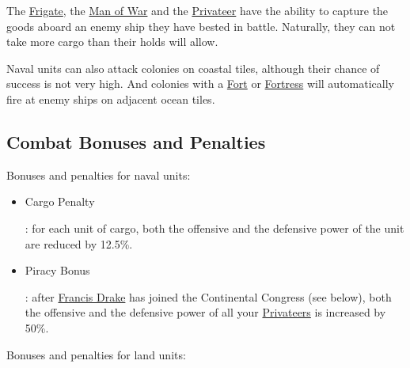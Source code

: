\documentclass[12pt]{book}
\begin{document}
The \hyperlink{Frigate}{Frigate}, the \hyperlink{Man of War}{Man of
War} and the \hyperlink{Privateer}{Privateer} have the ability to
capture the goods aboard an enemy ship they have bested in
battle. Naturally, they can not take more cargo than their holds will
allow.

Naval units can also attack colonies on coastal tiles, although their
chance of success is not very high. And colonies with a
\hyperlink{Fort}{Fort} or \hyperlink{Fortress}{Fortress} will
automatically fire at enemy ships on adjacent ocean tiles.


\hypertarget{combat bonuses}{\subsection{Combat Bonuses and Penalties}}

Bonuses and penalties for naval units:

\begin{itemize}
\item \hypertarget{Cargo Penalty}{Cargo Penalty}: for each unit of
  cargo, both the offensive and the defensive power of the unit are
  reduced by 12.5\%.
\item \hypertarget{Piracy Bonus}{Piracy Bonus}: after
  \hyperlink{Francis Drake}{Francis Drake} has joined the Continental
  Congress (see below), both the offensive and the defensive power of
  all your \hyperlink{Privateer}{Privateers} is increased by 50\%.
\end{itemize}

Bonuses and penalties for land units:
\end{document}
